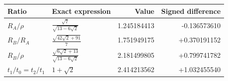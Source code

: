\begin{tabular}{@{}llrr@{}}\toprule Ratio & Exact expression & Value & Signed difference\\\midrule
$R_A/\rho$ & $\frac{\sqrt{7}}{\sqrt{13 - 6 \sqrt{2}}}$ & 1.245184413 & -0.136573610 \\
$R_B/R_A$ & $\frac{\sqrt{42 \sqrt{2} + 91}}{7}$ & 1.751949175 & +0.370191152 \\
$R_B/\rho$ & $\frac{\sqrt{6 \sqrt{2} + 13}}{\sqrt{13 - 6 \sqrt{2}}}$ & 2.181499805 & +0.799741782 \\
$t_1/t_0=t_2/t_1$ & $1 + \sqrt{2}$ & 2.414213562 & +1.032455540 \\
\bottomrule\end{tabular}